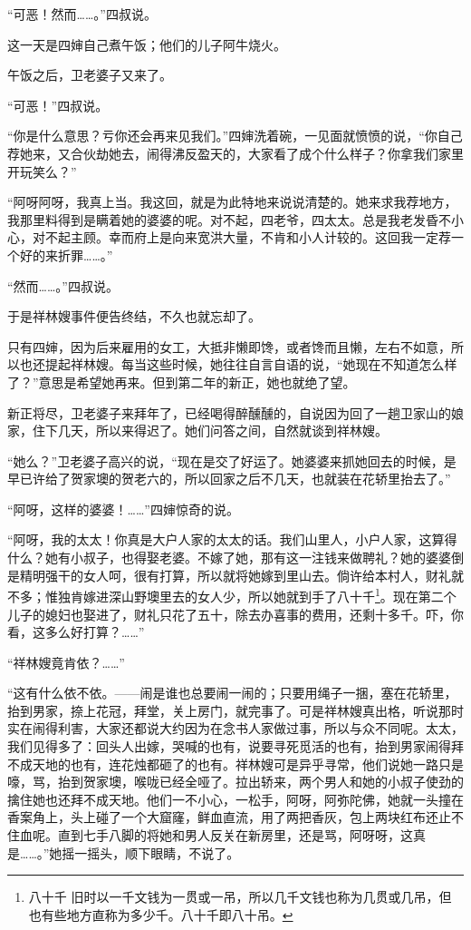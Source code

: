 \par “可恶！然而……。”四叔说。
\par 这一天是四婶自己煮午饭；他们的儿子阿牛烧火。
\par 午饭之后，卫老婆子又来了。
\par “可恶！”四叔说。
\par “你是什么意思？亏你还会再来见我们。”四婶洗着碗，一见面就愤愤的说，“你自己荐她来，又合伙劫她去，闹得沸反盈天的，大家看了成个什么样子？你拿我们家里开玩笑么？”
\par “阿呀阿呀，我真上当。我这回，就是为此特地来说说清楚的。她来求我荐地方，我那里料得到是瞒着她的婆婆的呢。对不起，四老爷，四太太。总是我老发昏不小心，对不起主顾。幸而府上是向来宽洪大量，不肯和小人计较的。这回我一定荐一个好的来折罪……。”
\par “然而……。”四叔说。
\par 于是祥林嫂事件便告终结，不久也就忘却了。
\par 只有四婶，因为后来雇用的女工，大抵非懒即馋，或者馋而且懒，左右不如意，所以也还提起祥林嫂。每当这些时候，她往往自言自语的说，“她现在不知道怎么样了？”意思是希望她再来。但到第二年的新正，她也就绝了望。
\par 新正将尽，卫老婆子来拜年了，已经喝得醉醺醺的，自说因为回了一趟卫家山的娘家，住下几天，所以来得迟了。她们问答之间，自然就谈到祥林嫂。
\par “她么？”卫老婆子高兴的说，“现在是交了好运了。她婆婆来抓她回去的时候，是早已许给了贺家墺的贺老六的，所以回家之后不几天，也就装在花轿里抬去了。”
\par “阿呀，这样的婆婆！……”四婶惊奇的说。
\par “阿呀，我的太太！你真是大户人家的太太的话。我们山里人，小户人家，这算得什么？她有小叔子，也得娶老婆。不嫁了她，那有这一注钱来做聘礼？她的婆婆倒是精明强干的女人呵，很有打算，所以就将她嫁到里山去。倘许给本村人，财礼就不多；惟独肯嫁进深山野墺里去的女人少，所以她就到手了八十千\footnote{八十千 旧时以一千文钱为一贯或一吊，所以几千文钱也称为几贯或几吊，但也有些地方直称为多少千。八十千即八十吊。}。现在第二个儿子的媳妇也娶进了，财礼只花了五十，除去办喜事的费用，还剩十多千。吓，你看，这多么好打算？……”
\par “祥林嫂竟肯依？……”
\par “这有什么依不依。——闹是谁也总要闹一闹的；只要用绳子一捆，塞在花轿里，抬到男家，捺上花冠，拜堂，关上房门，就完事了。可是祥林嫂真出格，听说那时实在闹得利害，大家还都说大约因为在念书人家做过事，所以与众不同呢。太太，我们见得多了：回头人出嫁，哭喊的也有，说要寻死觅活的也有，抬到男家闹得拜不成天地的也有，连花烛都砸了的也有。祥林嫂可是异乎寻常，他们说她一路只是嚎，骂，抬到贺家墺，喉咙已经全哑了。拉出轿来，两个男人和她的小叔子使劲的擒住她也还拜不成天地。他们一不小心，一松手，阿呀，阿弥陀佛，她就一头撞在香案角上，头上碰了一个大窟窿，鲜血直流，用了两把香灰，包上两块红布还止不住血呢。直到七手八脚的将她和男人反关在新房里，还是骂，阿呀呀，这真是……。”她摇一摇头，顺下眼睛，不说了。
